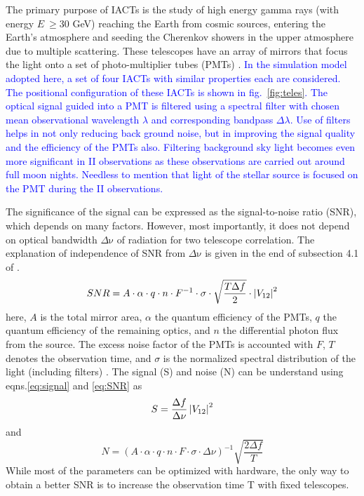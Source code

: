 The primary purpose of IACTs is the study of high energy gamma rays (with energy $E\ \geq 30$ GeV) reaching the Earth from cosmic sources, entering the Earth's atmosphere and seeding the Cherenkov showers in the upper atmosphere due to multiple scattering. These telescopes have an array of mirrors that focus the light onto a set of photo-multiplier tubes (PMTs) \cite{aleksic2016major}. 
\textcolor{blue}{In the simulation model adopted here, a set of four IACTs with similar properties each are considered. The positional configuration of these IACTs is shown in fig.~\ref{fig:teles}. The optical signal guided into a PMT is filtered using a spectral filter with chosen mean observational wavelength $\lambda$ and corresponding bandpass $\Delta \lambda$. 
Use of filters helps in not only reducing back ground noise, but in improving the signal quality and the efficiency of the PMTs also. Filtering background sky light becomes even more significant in II observations as these observations are carried out around full moon nights. Needless to mention that light of the stellar source is focused on the PMT during the II observations.}

The significance of the signal can be expressed as the signal-to-noise ratio (SNR), which depends on many factors. However, most importantly, it does not depend on optical bandwidth $\Delta {\mathrm {\nu}}$ of radiation for two telescope correlation. The explanation of independence of SNR from  $\Delta {\mathrm {\nu}}$ is given in the end of subsection 4.1 of \cite{10.1093/mnras/stab2391}.  
\begin{equation}
	SNR = A \cdot \alpha \cdot q \cdot n \cdot F^{-1} \cdot \sigma \cdot \sqrt{\frac{T \Delta f}{2}} \cdot \left|V_{12}\right|^{2}
	\label{eq:SNR}
\end{equation}
here, $A$ is the total mirror area, $\alpha$ the quantum efficiency of the PMTs, $q$ the quantum efficiency of the remaining optics, and $n$ the differential photon flux from the source. The excess noise factor of the PMTs is accounted with $F$, $T$ denotes the observation time, and $\sigma$ is the normalized spectral distribution of the light (including filters) \cite{acciari2020optical}. The signal (S) and noise (N) can be understand using eqns.\ref{eq:signal} and \ref{eq:SNR} as
\begin{equation}
	S = \frac{\Delta f}{\Delta \nu} \left|V_{12}\right|^2
\end{equation}
and
\begin{equation}
	N = (A \cdot \alpha \cdot q \cdot n \cdot F \cdot \sigma \cdot \Delta \nu)^{-1}\sqrt{\frac{2 \Delta f}{T}}
\end{equation}
While most of the parameters can be optimized with hardware, the only way to obtain a better SNR is to increase the observation time T with fixed telescopes. 
 
